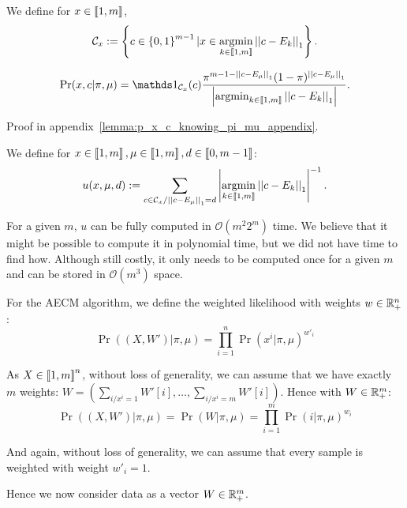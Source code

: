 We define for $x \in \left\llbracket1, m\right\rrbracket$, 
\[ \mathcal{C}_x := \left\{ c \in \left\{ 0, 1 \right\}^{m-1} | x \in \operatorname*{argmin}_{k \in \left\llbracket1, m\right\rrbracket} \left|\left|c - E_k\right|\right|_1  \right\} .\]

\begin{lemma}
    \label{lemma:p_x_c_knowing_pi_mu}
    \[\Pr(x, c | \pi, \mu) = \indic{}_{\mathcal{C}_x}(c) \frac{\pi^{m - 1 - \norm{c - E_{\mu}}_1} (1 - \pi)^{\norm{c - E_{\mu}}_1}}{\card{\argmin_{k \in \bbrack{1, m}} \norm{c - E_k}_1}} .\]
\end{lemma}

Proof in appendix~\ref{lemma:p_x_c_knowing_pi_mu_appendix}.


\begin{definition}
    We define for $x \in \left\llbracket1, m\right\rrbracket, \mu \in \left\llbracket1, m\right\rrbracket, d \in \left\llbracket0, m-1\right\rrbracket$:
    \[ u(x, \mu, d) := \sum_{c \in \mathcal{C}_x / \left|\left|c - E_{\mu}\right|\right|_1 = d}  \left|\operatorname*{argmin}_{k \in \left\llbracket1, m\right\rrbracket} \left|\left|c - E_k\right|\right|_1\right|^{-1} .\]
\end{definition}

For a given $m$, $u$ can be fully computed in $\mathcal O(m^2 2^m)$ time. We believe that it might be possible to compute it in polynomial time, but we did not have time to find how. Although still costly, it only needs to be computed once for a given $m$ and can be stored in $\mathcal O(m^3)$ space.

\begin{definition}
    For the AECM algorithm, we define the weighted likelihood with weights $w \in \mathbb{R}_+^n$:
    \[ \Pr((X, W') | \pi, \mu) = \prod_{i=1}^{n} \Pr(x^i | \pi, \mu)^{w'_i} \]

    As  $X \in \left\llbracket1, m\right\rrbracket^n$, without loss of generality, we can assume that we have exactly $m$ weights: $W = (\sum_{i / x^i = 1} W'[i], \dots, \sum_{i / x^i = m} W'[i])$. Hence with $W \in \mathbb{R}_+^m$:
    \[ \Pr((X, W') | \pi, \mu) = \Pr(W | \pi, \mu) = \prod_{i=1}^{m} \Pr(i | \pi, \mu)^{w_i} \]

    And again, without loss of generality, we can assume that every sample is weighted with weight $w'_i = 1$.

    Hence we now consider data as a vector $W \in \mathbb{R}_+^m$.
\end{definition}

